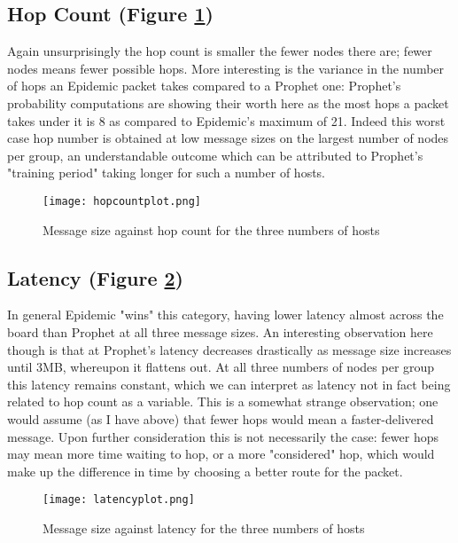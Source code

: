 \documentclass[12pt]{report}
\begin{document}
\subsection{Hop Count (Figure \ref{fig:hopcount})}
Again unsurprisingly the hop count is smaller the fewer nodes there are; fewer nodes means fewer possible hops.
More interesting is the variance in the number of hops an Epidemic packet takes compared to a Prophet one: Prophet's probability computations are showing their worth here as the most hops a packet takes under it is 8 as compared to Epidemic's maximum of 21.
Indeed this worst case hop number is obtained at low message sizes on the largest number of nodes per group, an understandable outcome which can be attributed to Prophet's "training period" taking longer for such a number of hosts.

\begin{figure}[ht]
  \caption{Message size against hop count for the three numbers of hosts}
  \centering
  \texttt{[image: hopcountplot.png]}
  \label{fig:hopcount}
\end{figure}

\subsection{Latency (Figure \ref{fig:latency})}
In general Epidemic "wins" this category, having lower latency almost across the board than Prophet at all three message sizes.
An interesting observation here though is that at Prophet's latency decreases drastically as message size increases until 3MB, whereupon it flattens out.
At all three numbers of nodes per group this latency remains constant, which we can interpret as latency not in fact being related to hop count as a variable.
This is a somewhat strange observation; one would assume (as I have above) that fewer hops would mean a faster-delivered message.
Upon further consideration this is not necessarily the case: fewer hops may mean more time waiting to hop, or a more "considered" hop, which would make up the difference in time by choosing a better route for the packet.

\begin{figure}[ht]
  \caption{Message size against latency for the three numbers of hosts}
  \centering
  \texttt{[image: latencyplot.png]}
  \label{fig:latency}
\end{figure}
\end{document}
